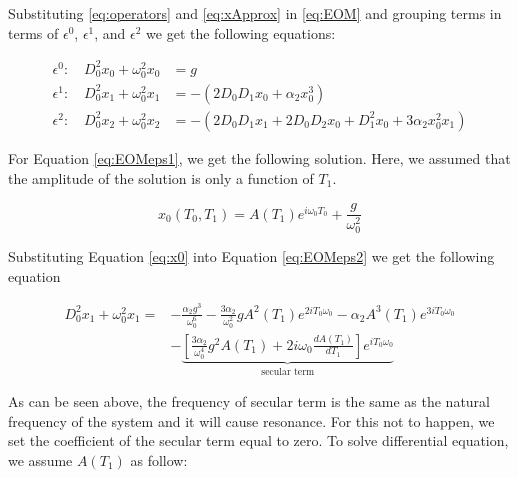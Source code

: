 Substituting \eqref{eq:operators} and \eqref{eq:xApprox} in \eqref{eq:EOM} and grouping terms in terms of $\epsilon^0$, $\epsilon^1$, and $\epsilon^2$ we get the following equations:

%
\begin{subequations}\label{eq:EOMeps}
\begin{align}
	\epsilon^0 : \quad D_{0}^{2} x_{0} + \omega_{0}^{2} x_{0} &= g
	\label{eq:EOMeps1}
	\\
	\epsilon^1 : \quad D_{0}^{2} x_{1} + \omega_{0}^{2} x_{1} &= -
				 \left( 
				 2 D_{0} D_{1} x_{0} + \alpha_{2} x_{0}^{3}
				 \right)
	\label{eq:EOMeps2}
	\\
	\epsilon^2 : \quad D_{0}^{2} x_{2} + \omega_{0}^{2} x_{2} &= -
				\left(
				2 D_{0} D_{1} x_{1} + 2 D_{0} D_{2} x_{0} + 
				D_{1}^{2} x_{0} + 3 \alpha_{2} x_{0}^{2} x_{1}
				\right)
	\label{eq:EOMeps3}
\end{align}
\end{subequations}
%

For Equation \eqref{eq:EOMeps1}, we get the following solution. Here, we assumed that the amplitude of the solution is only a function of $T_1$. 

%
\begin{equation}\label{eq:x0}
	x_0 \left( T_0, T_1 \right) = 
	A(T_1) e^{i\omega_0 T_0} + \frac{g}{\omega_0^2}
\end{equation}
%

Substituting Equation \eqref{eq:x0} into Equation \eqref{eq:EOMeps2} we get the following equation

%
\begin{align}\label{eq:eqForX1}
D_{0}^{2} x_{1} + \omega_{0}^{2} x_{1} =
&- \frac{\alpha_{2} g^{3}}{\omega_{0}^{6}} - 
\frac{3 \alpha_{2}}{\omega_{0}^{2}} g A^{2}{\left (T_{1} \right )} e^{2 i T_{0} \omega_{0}} - 
\alpha_{2} A^{3}{\left (T_{1} \right )} e^{3 i T_{0} \omega_{0}}
\nonumber \\
&-\underbrace{\left[
\frac{3 \alpha_{2}}{\omega_{0}^{4}} g^{2} A{\left (T_{1} \right )} +  2 i \omega_{0} \frac{dA{\left (T_{1} \right )}}{d T_{1}}
\right]
e^{i T_{0} \omega_{0}}}_\text{secular term}
\end{align}
%

As can be seen above, the frequency of secular term is the same as the natural frequency of the system and it will cause resonance. For this not to happen, we set the coefficient of the secular term equal to zero. To solve differential equation, we assume $A(T_1)$ as follow:

